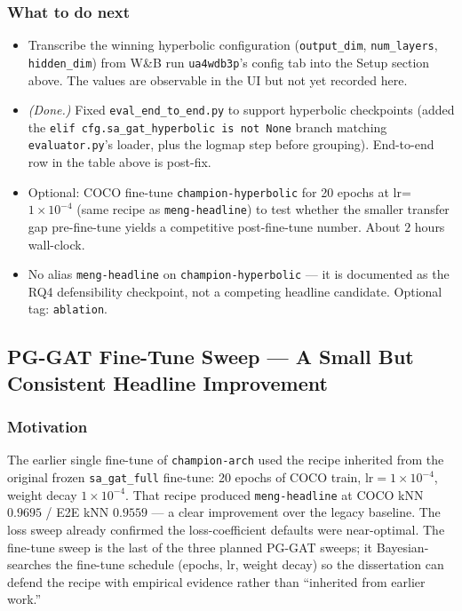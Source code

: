 \subsubsection{What to do next}

\begin{itemize}
    \item Transcribe the winning hyperbolic configuration (\texttt{output\_dim}, \texttt{num\_layers}, \texttt{hidden\_dim}) from W\&B run \texttt{ua4wdb3p}'s config tab into the Setup section above. The values are observable in the UI but not yet recorded here.
    \item \emph{(Done.)} Fixed \texttt{eval\_end\_to\_end.py} to support hyperbolic checkpoints (added the \texttt{elif cfg.sa\_gat\_hyperbolic is not None} branch matching \texttt{evaluator.py}'s loader, plus the logmap step before grouping). End-to-end row in the table above is post-fix.
    \item Optional: COCO fine-tune \texttt{champion-hyperbolic} for 20 epochs at lr=$1\!\times\!10^{-4}$ (same recipe as \texttt{meng-headline}) to test whether the smaller transfer gap pre-fine-tune yields a competitive post-fine-tune number. About $2$ hours wall-clock.
    \item No alias \texttt{meng-headline} on \texttt{champion-hyperbolic} --- it is documented as the RQ4 defensibility checkpoint, not a competing headline candidate. Optional tag: \texttt{ablation}.
\end{itemize}

\subsection{PG-GAT Fine-Tune Sweep --- A Small But Consistent Headline Improvement}

\subsubsection{Motivation}

The earlier single fine-tune of \texttt{champion-arch} used the recipe inherited from the original frozen \texttt{sa\_gat\_full} fine-tune: 20 epochs of COCO train, lr$=1\!\times\!10^{-4}$, weight decay $1\!\times\!10^{-4}$.
That recipe produced \texttt{meng-headline} at COCO kNN $0.9695$ / E2E kNN $0.9559$ --- a clear improvement over the legacy baseline.
The loss sweep already confirmed the loss-coefficient defaults were near-optimal.
The fine-tune sweep is the last of the three planned PG-GAT sweeps; it Bayesian-searches the fine-tune schedule (epochs, lr, weight decay) so the dissertation can defend the recipe with empirical evidence rather than ``inherited from earlier work.''

